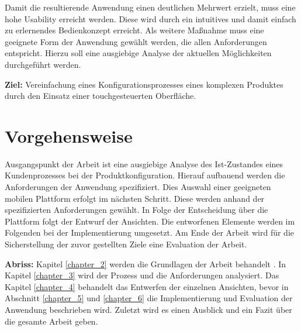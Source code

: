 Damit die resultierende Anwendung einen deutlichen Mehrwert erzielt, muss eine hohe Usability erreicht werden. Diese wird durch ein intuitives und damit einfach zu erlernendes Bedienkonzept erreicht. Als weitere Maßnahme muss eine geeignete Form der Anwendung gewählt werden, die allen Anforderungen entspricht. Hierzu soll eine ausgiebige Analyse der aktuellen Möglichkeiten durchgeführt werden.

\textbf{Ziel:} \newline
Vereinfachung eines Konfigurationsprozesses eines komplexen Produktes durch den Einsatz einer touchgesteuerten Oberfläche.

\section{Vorgehensweise}
Ausgangspunkt der Arbeit ist eine ausgiebige Analyse des Ist-Zustandes eines Kundenprozesses bei der Produktkonfiguration. Hierauf aufbauend werden die Anforderungen der Anwendung spezifiziert. Dies Auswahl einer geeigneten mobilen Plattform erfolgt im nächsten Schritt. Diese werden anhand der spezifizierten Anforderungen gewählt. In Folge der Entscheidung über die Plattform folgt der Entwurf der Ansichten. Die entworfenen Elemente werden im Folgenden bei der Implementierung umgesetzt. Am Ende der Arbeit wird für die Sicherstellung der zuvor gestellten Ziele eine Evaluation der Arbeit. 
\par
\textbf{Abriss: }
Kapitel \ref{chapter_2} werden die Grundlagen der Arbeit behandelt . In Kapitel \ref{chapter_3} wird der Prozess und die Anforderungen analysiert. Das Kapitel \ref{chapter_4} behandelt das Entwerfen der einzelnen Ansichten, bevor in Abschnitt \ref{chapter_5} und \ref{chapter_6} die Implementierung und Evaluation der Anwendung beschrieben wird. Zuletzt wird es einen Ausblick und ein Fazit über die gesamte Arbeit geben.







